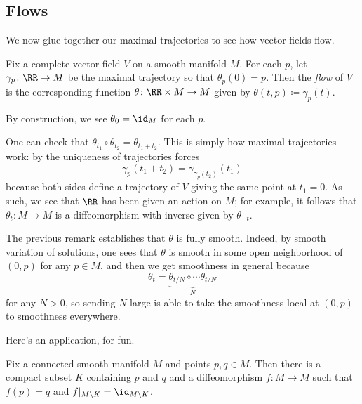 \documentclass[../notes.tex]{subfiles}
\begin{document}
\subsection{Flows}
We now glue together our maximal trajectories to see how vector fields flow.
\begin{definition}[flow]
	Fix a complete vector field $V$ on a smooth manifold $M$. For each $p$, let $\gamma_p\colon\RR\to M$ be the maximal trajectory so that $\theta_p(0)=p$. Then the \textit{flow} of $V$ is the corresponding function $\theta\colon\RR\times M\to M$ given by $\theta(t,p)\coloneqq\gamma_p(t)$.
\end{definition}
\begin{remark}
	By construction, we see $\theta_0=\id_M$ for each $p$.
\end{remark}
\begin{remark} \label{rem:additive-diffeo}
	One can check that $\theta_{t_1}\circ\theta_{t_2}=\theta_{t_1+t_2}$. This is simply how maximal trajectories work: by the uniqueness of trajectories forces
	\[\gamma_p(t_1+t_2)=\gamma_{\gamma_p(t_2)}(t_1)\]
	because both sides define a trajectory of $V$ giving the same point at $t_1=0$. As such, we see that $\RR$ has been given an action on $M$; for example, it follows that $\theta_t\colon M\to M$ is a diffeomorphism with inverse given by $\theta_{-t}$.
\end{remark}
\begin{remark}
	The previous remark establishes that $\theta$ is fully smooth. Indeed, by smooth variation of solutions, one sees that $\theta$ is smooth in some open neighborhood of $(0,p)$ for any $p\in M$, and then we get smoothness in general because
	\[\theta_t=\underbrace{\theta_{t/N}\circ\cdots\theta_{t/N}}_N\]
	for any $N>0$, so sending $N$ large is able to take the smoothness local at $(0,p)$ to smoothness everywhere.
\end{remark}
Here's an application, for fun.
\begin{proposition}
	Fix a connected smooth manifold $M$ and points $p,q\in M$. Then there is a compact subset $K$ containing $p$ and $q$ and a diffeomorphism $f\colon M\to M$ such that $f(p)=q$ and $f|_{M\setminus K}=\id_{M\setminus K}$.
\end{proposition}
\end{document}

